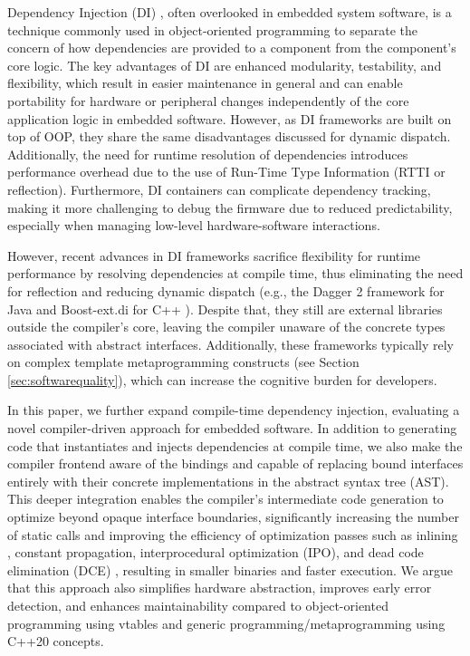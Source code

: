 \documentclass[sigconf]{acmart}
\begin{document}
Dependency Injection (DI) \cite{seemann2019dependency}, often overlooked in embedded system software, is a technique commonly used in object-oriented programming to separate the concern of how dependencies are provided to a component from the component's core logic. The key advantages of DI are enhanced modularity, testability, and flexibility, which result in easier maintenance in general and can enable portability for hardware or peripheral changes independently of the core application logic in embedded software. However, as DI frameworks are built on top of OOP, they share the same disadvantages discussed for dynamic dispatch. Additionally, the need for runtime resolution of dependencies introduces performance overhead due to the use of Run-Time Type Information (RTTI or reflection). Furthermore, DI containers can complicate dependency tracking, making it more challenging to debug the firmware due to reduced predictability, especially when managing low-level hardware-software interactions.

However, recent advances in DI frameworks sacrifice flexibility for runtime performance by resolving dependencies at compile time, thus eliminating the need for reflection and reducing dynamic dispatch (e.g., the Dagger 2 framework \cite{dagger2} for Java and Boost-ext.di for C++ \cite{boostdi2018}). Despite that, they still are external libraries outside the compiler's core, leaving the compiler unaware of the concrete types associated with abstract interfaces. Additionally, these frameworks typically rely on complex template metaprogramming constructs (see Section \ref{sec:softwarequality}), which can increase the cognitive burden for developers. 

In this paper, we further expand compile-time dependency injection, evaluating a novel compiler-driven approach for embedded software. In addition to generating code that instantiates and injects dependencies at compile time, we also make the compiler frontend aware of the bindings and capable of replacing bound interfaces entirely with their concrete implementations in the abstract syntax tree (AST). This deeper integration enables the compiler's intermediate code generation to optimize beyond opaque interface boundaries, significantly increasing the number of static calls and improving the efficiency of optimization passes such as inlining \cite{damasio2021}, constant propagation, interprocedural optimization (IPO), and dead code elimination (DCE) \cite{cooper2021compiler}, resulting in smaller binaries and faster execution. We argue that this approach also simplifies hardware abstraction, improves early error detection, and enhances maintainability compared to object-oriented programming using vtables and generic programming/metaprogramming using C++20 concepts.
\end{document}
